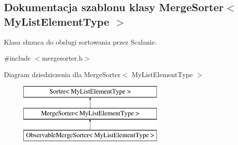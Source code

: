 \hypertarget{class_merge_sorter}{\subsection{Dokumentacja szablonu klasy Merge\-Sorter$<$ My\-List\-Element\-Type $>$}
\label{class_merge_sorter}
}


Klasa sluzaca do obslugi sortowania przez Scalanie.  




{\ttfamily \#include $<$mergesorter.\-h$>$}

Diagram dziedziczenia dla Merge\-Sorter$<$ My\-List\-Element\-Type $>$\begin{figure}[H]
\begin{center}
\leavevmode
\includegraphics[height=3.000000cm]{class_merge_sorter}
\end{center}
\end{figure}
